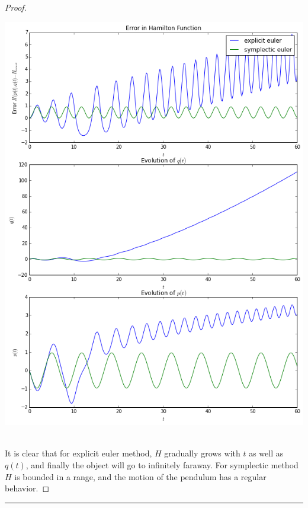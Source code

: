 \documentclass[a4paper, 10pt]{article}
\theoremstyle{definition}
\theoremstyle{hSol}
\begin{document}
\begin{proof}
\begin{center}
\includegraphics[scale=0.4]{hw3_p1.png}
\end{center}

~\\
It is clear that for explicit euler method, $H$ gradually grows with $t$ as well as $q(t)$, and finally the object will go to infinitely faraway. For symplectic method $H$ is bounded in a range, and the motion of the pendulum has a regular behavior. 
\end{proof} 
\noindent\rule{16cm}{0.4pt}
\end{document}
